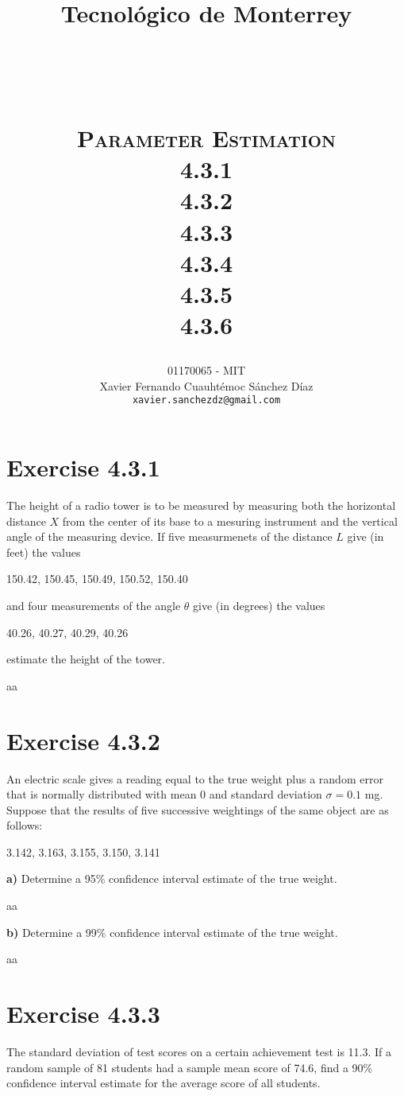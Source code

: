 \documentclass[titlepage, letterpaper, fleqn]{article}
\title{
\vspace{1in}
\textbf{Tecnológico de Monterrey} \\
\vspace{0.5in}
\textmd{\mahclass} \\
\large{\textit{\mahteacher}} \\
\vspace{0.5in}
\textsc{\mahtitle}\\
\textsc{Parameter Estimation}\\
\textsc{4.3.1}\\
\textsc{4.3.2}\\
\textsc{4.3.3}\\
\textsc{4.3.4}\\
\textsc{4.3.5}\\
\textsc{4.3.6}\\
\author{01170065  - MIT \\
Xavier Fernando Cuauhtémoc Sánchez Díaz \\
\texttt{xavier.sanchezdz@gmail.com}}
\date{\mahdate}
}
\newcommand{\spacepls}{\vspace{5mm}}
\begin{document}
\begin{titlepage}
\maketitle
\end{titlepage}

%
%

\section{Exercise 4.3.1}

{\large The height of a radio tower is to be measured by measuring both the horizontal distance $X$ from the center of its base to a mesuring instrument and the vertical angle of the measuring device.
If five measurmenets of the distance $L$ give (in feet) the values

150.42, 150.45, 150.49, 150.52, 150.40

and four measurements of the angle $\theta$ give (in degrees) the values

40.26, 40.27, 40.29, 40.26

estimate the height of the tower.}

aa

\section{Exercise 4.3.2}

{\large An electric scale gives a reading equal to the true weight plus a random error that is normally distributed with mean 0 and standard deviation $\sigma = 0.1$ mg.
Suppose that the results of five successive weightings of the same object are as follows:

3.142, 3.163, 3.155, 3.150, 3.141

\textbf{a)} Determine a 95\% confidence interval estimate of the true weight.}

aa

\spacepls

{\large \textbf{b)} Determine a 99\% confidence interval estimate of the true weight.}

aa

\spacepls

\section{Exercise 4.3.3}

{\large The standard deviation of test scores on a certain achievement test is 11.3.
If a random sample of 81 students had a sample mean score of 74.6,
find a 90\% confidence interval estimate for the average score of all students.}
\end{document}
